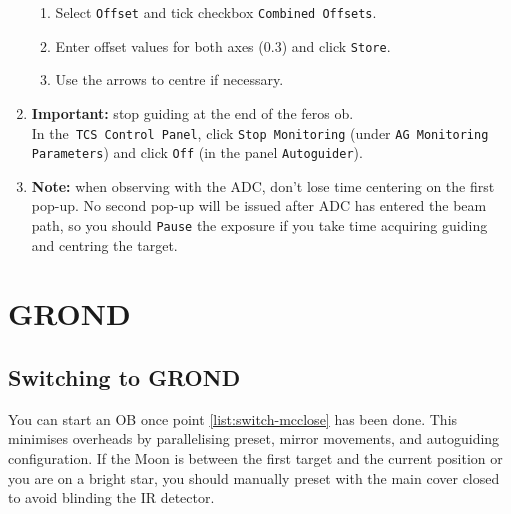 \documentclass[11pt,fleqn]{book}
\begin{document}
\begin{enumerate}
\begin{enumerate}
       \item Select \texttt{Offset} and tick checkbox \texttt{Combined Offsets}.
       \item Enter offset values for both axes (0.3) and click \texttt{Store}.
       \item Use the arrows to centre if necessary.  
    \end{enumerate}
  \item \textbf{Important:} stop guiding at the end of the \gls{feros} \gls{ob}.\\
  In the\texttt{ TCS Control Panel}, click \texttt{Stop Monitoring} (under \texttt{AG Monitoring Parameters}) and click \texttt{Off} (in the panel \texttt{Autoguider}).  
  \item \textbf{Note:} when observing with the ADC, don't lose time centering on the first pop-up.  No second
     pop-up will be issued after ADC has entered the beam path, so you should
     \texttt{Pause} the exposure if you take time acquiring guiding and centring
     the target.
\end{enumerate}

\section{GROND}

\subsection{Switching to GROND}

You can start an OB once point \ref{list:switch-mcclose} has been done.  This minimises overheads by parallelising preset, mirror movements, and autoguiding configuration.  If the Moon is between the first target and the current position or you are on a bright star, you should manually preset with the main cover closed to avoid blinding the IR detector.
\end{document}
